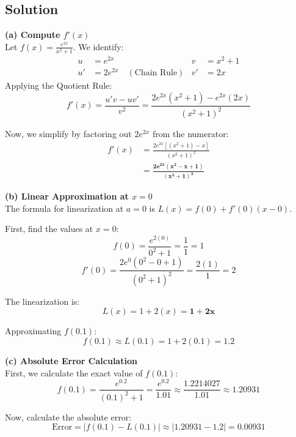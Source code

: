 \subsection*{Solution}

\textbf{(a) Compute $f'(x)$} \\
    Let $f(x) = \frac{e^{2x}}{x^2+1}$. We identify:
    \begin{align*}
        u &= e^{2x} & v &= x^2+1 \\
        u' &= 2e^{2x} \quad (\text{Chain Rule}) & v' &= 2x
    \end{align*}
    Applying the Quotient Rule:
    \[ f'(x) = \frac{u'v - uv'}{v^2} = \frac{2e^{2x}(x^2+1) - e^{2x}(2x)}{(x^2+1)^2} \]
    
    Now, we simplify by factoring out $2e^{2x}$ from the numerator:
    \begin{align*}
        f'(x) &= \frac{2e^{2x} \left[ (x^2+1) - x \right]}{(x^2+1)^2} \\
        &= \mathbf{\frac{2e^{2x}(x^2 - x + 1)}{(x^2+1)^2}}
    \end{align*}

\textbf{(b) Linear Approximation at $x=0$} \\
    The formula for linearization at $a=0$ is $L(x) = f(0) + f'(0)(x-0)$.
    
    First, find the values at $x=0$:
    \[ f(0) = \frac{e^{2(0)}}{0^2+1} = \frac{1}{1} = 1 \]
    \[ f'(0) = \frac{2e^0(0^2 - 0 + 1)}{(0^2+1)^2} = \frac{2(1)}{1} = 2 \]
    
    The linearization is:
    \[ L(x) = 1 + 2(x) = \mathbf{1 + 2x} \]
    
    Approximating $f(0.1)$:
    \[ f(0.1) \approx L(0.1) = 1 + 2(0.1) = \mathbf{1.2} \]

\textbf{(c) Absolute Error Calculation} \\
    First, we calculate the exact value of $f(0.1)$:
    \[ f(0.1) = \frac{e^{0.2}}{(0.1)^2+1} = \frac{e^{0.2}}{1.01} \approx \frac{1.2214027}{1.01} \approx 1.20931 \]
    
    Now, calculate the absolute error:
    \[ \text{Error} = | f(0.1) - L(0.1) | \approx | 1.20931 - 1.2 | = \mathbf{0.00931} \]

